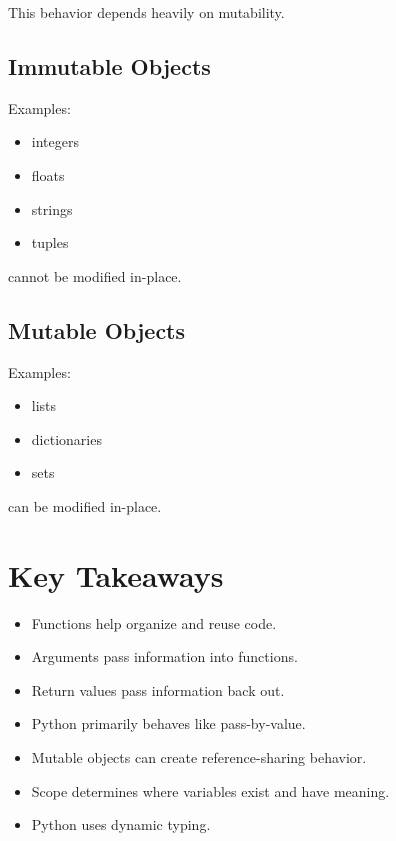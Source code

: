 \documentclass[11pt]{article}
\begin{document}
This behavior depends heavily on mutability.

\subsection{Immutable Objects}

Examples:

\begin{itemize}
    \item integers
    \item floats
    \item strings
    \item tuples
\end{itemize}

cannot be modified in-place.

\subsection{Mutable Objects}

Examples:

\begin{itemize}
    \item lists
    \item dictionaries
    \item sets
\end{itemize}

can be modified in-place.

\section{Key Takeaways}

\begin{itemize}
    \item Functions help organize and reuse code.

    \item Arguments pass information into functions.

    \item Return values pass information back out.

    \item Python primarily behaves like pass-by-value.

    \item Mutable objects can create reference-sharing behavior.

    \item Scope determines where variables exist and have meaning.

    \item Python uses dynamic typing.
\end{itemize}
\end{document}

